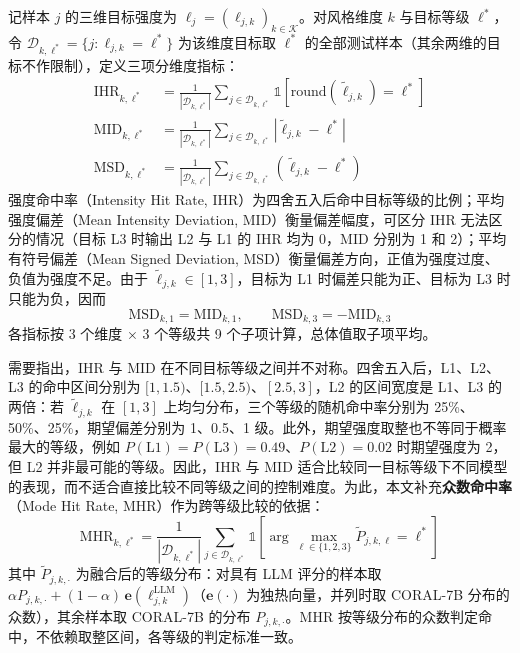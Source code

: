 \documentclass[fontset=fandol,type=master,campus=shenzhen,etitleauto=true]{hithesisbook}
\begin{document}
记样本 $j$ 的三维目标强度为 $\boldsymbol{\ell}_j = (\ell_{j,k})_{k \in \mathcal{K}}$。对风格维度 $k$ 与目标等级 $\ell^*$，令 $\mathcal{D}_{k,\ell^*} = \{ j : \ell_{j,k} = \ell^* \}$ 为该维度目标取 $\ell^*$ 的全部测试样本（其余两维的目标不作限制），定义三项分维度指标：
\begin{equation}
\begin{aligned}
\text{IHR}_{k,\ell^*} &= \frac{1}{|\mathcal{D}_{k,\ell^*}|} \sum_{j \in \mathcal{D}_{k,\ell^*}} \mathbb{1}\!\left[\text{round}(\tilde{\ell}_{j,k}) = \ell^*\right] \\
\text{MID}_{k,\ell^*} &= \frac{1}{|\mathcal{D}_{k,\ell^*}|} \sum_{j \in \mathcal{D}_{k,\ell^*}} \left|\tilde{\ell}_{j,k} - \ell^*\right| \\
\text{MSD}_{k,\ell^*} &= \frac{1}{|\mathcal{D}_{k,\ell^*}|} \sum_{j \in \mathcal{D}_{k,\ell^*}} \left(\tilde{\ell}_{j,k} - \ell^*\right)
\end{aligned}
\end{equation}
强度命中率（Intensity Hit Rate, IHR）为四舍五入后命中目标等级的比例；平均强度偏差（Mean Intensity Deviation, MID）衡量偏差幅度，可区分 IHR 无法区分的情况（目标 L3 时输出 L2 与 L1 的 IHR 均为 0，MID 分别为 1 和 2）；平均有符号偏差（Mean Signed Deviation, MSD）衡量偏差方向，正值为强度过度、负值为强度不足。由于 $\tilde{\ell}_{j,k} \in [1, 3]$，目标为 L1 时偏差只能为正、目标为 L3 时只能为负，因而
\begin{equation}\label{eq:msd-mid}
\text{MSD}_{k,1} = \text{MID}_{k,1}, \qquad \text{MSD}_{k,3} = -\text{MID}_{k,3}
\end{equation}
各指标按 3 个维度 × 3 个等级共 9 个子项计算，总体值取子项平均。

需要指出，IHR 与 MID 在不同目标等级之间并不对称。四舍五入后，L1、L2、L3 的命中区间分别为 $[1, 1.5)$、$[1.5, 2.5)$、$[2.5, 3]$，L2 的区间宽度是 L1、L3 的两倍：若 $\tilde{\ell}_{j,k}$ 在 $[1, 3]$ 上均匀分布，三个等级的随机命中率分别为 25\%、50\%、25\%，期望偏差分别为 1、0.5、1 级。此外，期望强度取整也不等同于概率最大的等级，例如 $P(\text{L1}) = P(\text{L3}) = 0.49$、$P(\text{L2}) = 0.02$ 时期望强度为 2，但 L2 并非最可能的等级。因此，IHR 与 MID 适合比较同一目标等级下不同模型的表现，而不适合直接比较不同等级之间的控制难度。为此，本文补充\textbf{众数命中率}（Mode Hit Rate, MHR）作为跨等级比较的依据：
\begin{equation}\label{eq:mhr}
\text{MHR}_{k,\ell^*} = \frac{1}{|\mathcal{D}_{k,\ell^*}|} \sum_{j \in \mathcal{D}_{k,\ell^*}} \mathbb{1}\!\left[ \arg\max_{\ell \in \{1,2,3\}} \tilde{P}_{j,k,\ell} = \ell^* \right]
\end{equation}
其中 $\tilde{P}_{j,k,\cdot}$ 为融合后的等级分布：对具有 LLM 评分的样本取 $\alpha P_{j,k,\cdot} + (1 - \alpha)\, \mathbf{e}(\ell^{\text{LLM}}_{j,k})$（$\mathbf{e}(\cdot)$ 为独热向量，并列时取 CORAL-7B 分布的众数），其余样本取 CORAL-7B 的分布 $P_{j,k,\cdot}$。MHR 按等级分布的众数判定命中，不依赖取整区间，各等级的判定标准一致。
\end{document}
